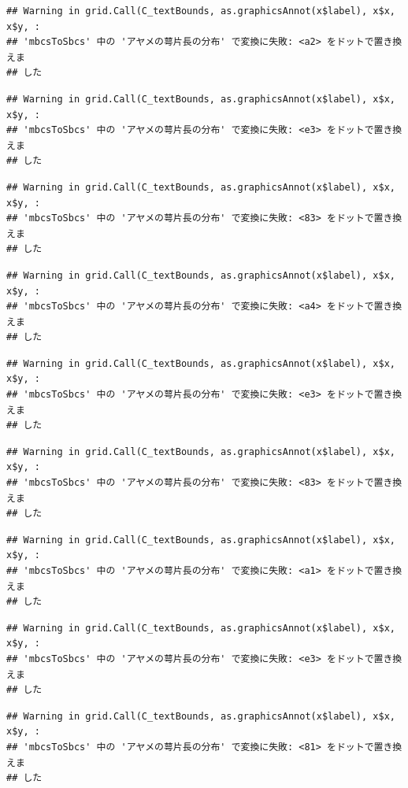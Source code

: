 \documentclass[
]{book}
\begin{document}
\begin{verbatim}
## Warning in grid.Call(C_textBounds, as.graphicsAnnot(x$label), x$x, x$y, :
## 'mbcsToSbcs' 中の 'アヤメの萼片長の分布' で変換に失敗: <a2> をドットで置き換えま
## した
\end{verbatim}

\begin{verbatim}
## Warning in grid.Call(C_textBounds, as.graphicsAnnot(x$label), x$x, x$y, :
## 'mbcsToSbcs' 中の 'アヤメの萼片長の分布' で変換に失敗: <e3> をドットで置き換えま
## した
\end{verbatim}

\begin{verbatim}
## Warning in grid.Call(C_textBounds, as.graphicsAnnot(x$label), x$x, x$y, :
## 'mbcsToSbcs' 中の 'アヤメの萼片長の分布' で変換に失敗: <83> をドットで置き換えま
## した
\end{verbatim}

\begin{verbatim}
## Warning in grid.Call(C_textBounds, as.graphicsAnnot(x$label), x$x, x$y, :
## 'mbcsToSbcs' 中の 'アヤメの萼片長の分布' で変換に失敗: <a4> をドットで置き換えま
## した
\end{verbatim}

\begin{verbatim}
## Warning in grid.Call(C_textBounds, as.graphicsAnnot(x$label), x$x, x$y, :
## 'mbcsToSbcs' 中の 'アヤメの萼片長の分布' で変換に失敗: <e3> をドットで置き換えま
## した
\end{verbatim}

\begin{verbatim}
## Warning in grid.Call(C_textBounds, as.graphicsAnnot(x$label), x$x, x$y, :
## 'mbcsToSbcs' 中の 'アヤメの萼片長の分布' で変換に失敗: <83> をドットで置き換えま
## した
\end{verbatim}

\begin{verbatim}
## Warning in grid.Call(C_textBounds, as.graphicsAnnot(x$label), x$x, x$y, :
## 'mbcsToSbcs' 中の 'アヤメの萼片長の分布' で変換に失敗: <a1> をドットで置き換えま
## した
\end{verbatim}

\begin{verbatim}
## Warning in grid.Call(C_textBounds, as.graphicsAnnot(x$label), x$x, x$y, :
## 'mbcsToSbcs' 中の 'アヤメの萼片長の分布' で変換に失敗: <e3> をドットで置き換えま
## した
\end{verbatim}

\begin{verbatim}
## Warning in grid.Call(C_textBounds, as.graphicsAnnot(x$label), x$x, x$y, :
## 'mbcsToSbcs' 中の 'アヤメの萼片長の分布' で変換に失敗: <81> をドットで置き換えま
## した
\end{verbatim}
\end{document}
